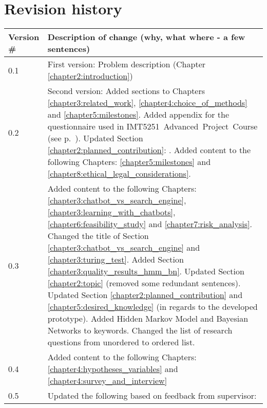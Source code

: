 \chapter*{Revision history}

\begin{center}
	\begin{tabular}[H]{|l|p{35em}|}
		\hline
		Version \#  & Description of change (why, what where - a few sentences)\\
		\hline
		0.1   & First version: Problem description (Chapter \ref{chapter2:introduction})\\
		\hline
		0.2   & Second version: Added sections to Chapters \ref{chapter3:related_work}, \ref{chapter4:choice_of_methods} and \ref{chapter5:milestones}. 
		\newline  
		Added appendix for the questionnaire used in \newline IMT5251~Advanced~Project~Course (see p.~\pageref{appendix:questionnaire}).
		\newline  
		Updated Section \ref{chapter2:planned_contribution}: \nameref{chapter2:planned_contribution}.
		\newline  
		Added content to the following Chapters: \ref{chapter5:milestones} and \ref{chapter8:ethical_legal_considerations}. \\
		\hline
		0.3   & Added content to the following Chapters: \ref{chapter3:chatbot_vs_search_engine}, \ref{chapter3:learning_with_chatbots}, 
		\ref{chapter6:feasibility_study} and \ref{chapter7:risk_analysis}. \newline
		Changed the title of Section \ref{chapter3:chatbot_vs_search_engine} and \ref{chapter3:turing_test}. 
		Added Section \ref{chapter3:quality_results_hmm_bn}. \newline
		Updated Section \ref{chapter2:topic} (removed some redundant sentences). \newline
		Updated Section \ref{chapter2:planned_contribution} and \ref{chapter5:desired_knowledge} (in regards to the developed prototype). \newline
		Added Hidden Markov Model and Bayesian Networks to keywords. \newline
		Changed the list of research questions from unordered to ordered list.	\\
		\hline
		0.4   & Added content to the following Chapters: \ref{chapter4:hypotheses_variables} and \ref{chapter4:survey_and_interview} \\
		\hline
		0.5   & Updated the following based on feedback from supervisor: \newline 

\end{tabular}
\end{center}
